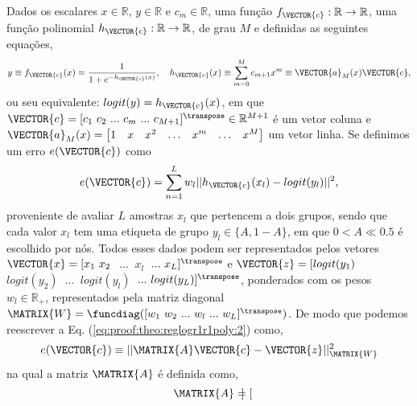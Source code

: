 
\begin{myproofT}\label{proof:theo:reglogr1r1poly}
Dados 
os escalares $x \in \mathbb{R}$, $y \in \mathbb{R}$ e $c_m \in \mathbb{R}$,
uma função $f_{\VECTOR{c}}:\mathbb{R} \rightarrow \mathbb{R}$, 
uma função polinomial $h_{\VECTOR{c}}:\mathbb{R} \rightarrow \mathbb{R}$, de grau $M$ e 
definidas as seguintes equações,
\begin{equation}\label{eq:proof:theo:reglogr1r1poly:1}
y\equiv f_{\VECTOR{c}}(x)= \frac{1}{1+e^{-h_{\VECTOR{c}}(x) }},
\quad h_{\VECTOR{c}}(x)\equiv \sum_{m=0}^{M}c_{m+1} x^m\equiv \VECTOR{a}_M(x)\VECTOR{c},
\end{equation}
ou seu equivalente: $logit(y)=h_{\VECTOR{c}}(x)$,
em que $\VECTOR{c}=[c_1~ c_2~ ...~ c_m~ ...~ c_{M+1}]^{\transpose} \in \mathbb{R}^{M+1}$ é um vetor coluna e
$\VECTOR{a}_M(x)=\begin{bmatrix} 
1& x& x^2& \hdots & x^m& \hdots& x^M
\end{bmatrix}$ um vetor linha.
Se definimos um erro $e(\VECTOR{c})$ como
\begin{equation}\label{eq:proof:theo:reglogr1r1poly:2}
e(\VECTOR{c}) =  \sum_{n=1}^{L} w_l||h_{\VECTOR{c}}(x_l)-logit(y_l)||^2,
\end{equation}
proveniente de avaliar $L$ amostras $x_l$ que pertencem a dois grupos, 
sendo que cada valor $x_l$ tem uma etiqueta de grupo $y_l\in \{A,1-A\}$, 
em que $0<A\ll 0.5$ é escolhido por nós.
Todos esses dados podem ser representados pelos vetores 
$\VECTOR{x}=[x_1~ x_2~$ $...~$ $x_l~$ $...~ x_L]^{\transpose}$ 
e $\VECTOR{z}=[logit(y_1)~$ $logit(y_2)~$ $...~$ $logit(y_l)~$ $...~ logit(y_L)]^{\transpose}$,
ponderados com os pesos $w_l \in \mathbb{R}_+$, 
representados pela matriz diagonal $\MATRIX{W}=\funcdiag([w_1~ w_2~ ...~ w_l~ ...~ w_L]^{\transpose})$.
De modo que podemos reescrever a Eq. (\ref{eq:proof:theo:reglogr1r1poly:2}) como,
\begin{equation}\label{eq:proof:theo:reglogr1r1poly:3}
e(\VECTOR{c}) \equiv ||\MATRIX{A}\VECTOR{c}-\VECTOR{z}||_{\MATRIX{W}}^2 
\end{equation}
na qual a matriz $\MATRIX{A}$ é definida como,
\begin{equation}\label{eq:proof:reglogr1r1poly:4}
\MATRIX{A}=\begin{bmatrix}

\end{bmatrix}
\end{equation}
\end{myproofT}
